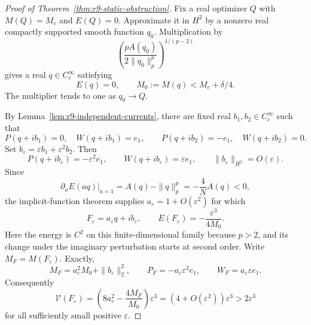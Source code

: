 \begin{proof}[Proof of Theorem~\ref{thm:r9-static-obstruction}]
Fix a real optimizer $Q$ with $M(Q)=M_c$ and $E(Q)=0$.
Approximate it in $H^2$ by a nonzero real compactly supported
smooth function $q_0$. Multiplication by
\[
 \left(\frac{pA(q_0)}{2\|q_0\|_p^p}\right)^{1/(p-2)}
\]
gives a real $q\in C_c^\infty$ satisfying
\begin{equation}\label{eq:r9-zero-energy-core}
 E(q)=0,\qquad M_0:=M(q)<M_c+\delta/4.
\end{equation}
The multiplier tends to one as $q_0\to Q$.

By Lemma~\ref{lem:r9-independent-currents}, there are fixed real
$b_1,b_2\in C_c^\infty$ such that
\[
 P(q+ib_1)=0,\quad W(q+ib_1)=e_1,\qquad
 P(q+ib_2)=-e_1,\quad W(q+ib_2)=0.
\]
Set $b_\varepsilon=\varepsilon b_1+\varepsilon^2b_2$. Then
\begin{equation}\label{eq:r9-prescribed-core-currents}
 P(q+ib_\varepsilon)=-\varepsilon^2e_1,\qquad
 W(q+ib_\varepsilon)=\varepsilon e_1,\qquad
 \|b_\varepsilon\|_{H^2}=O(\varepsilon).
\end{equation}
Since
\[
 \left.\partial_aE(aq)\right|_{a=1}
 =A(q)-\|q\|_p^p=-\frac4N A(q)<0,
\]
the implicit-function theorem supplies $a_\varepsilon=1+O(\varepsilon^2)$
for which
\begin{equation}\label{eq:r9-core-negative-energy}
 F_\varepsilon=a_\varepsilon q+ib_\varepsilon,
 \qquad E(F_\varepsilon)=-\frac{\varepsilon^3}{4M_0}.
\end{equation}
Here the energy is $C^2$ on this finite-dimensional family because
$p>2$, and its change under the imaginary perturbation starts at
second order. Write $M_F=M(F_\varepsilon)$. Exactly,
\[
 M_F=a_\varepsilon^2M_0+\|b_\varepsilon\|_2^2,
 \qquad P_F=-a_\varepsilon\varepsilon^2e_1,
 \qquad W_F=a_\varepsilon\varepsilon e_1.
\]
Consequently
\begin{equation}\label{eq:r9-core-positive-virial}
 \mathcal V(F_\varepsilon)
 =\left(8a_\varepsilon^2-\frac{4M_F}{M_0}\right)\varepsilon^3
 =(4+O(\varepsilon^2))\varepsilon^3>2\varepsilon^3
\end{equation}
for all sufficiently small positive $\varepsilon$.


\end{proof}
